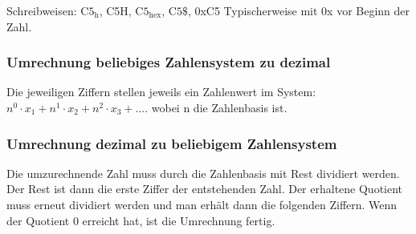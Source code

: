 Schreibweisen: $\text{C5}_{\text{h}}$, C5H, $\text{C5}_{\text{hex}}$, $\text{C5}\$$, 0xC5\newline
Typischerweise mit 0x vor Beginn der Zahl.

\subsubsection{Umrechnung beliebiges Zahlensystem zu dezimal}

Die jeweiligen Ziffern stellen jeweils ein Zahlenwert im System:\newline $n^0 \cdot x_1 + n^1 \cdot x_2 + n^2 \cdot x_3 + ....$ wobei n die Zahlenbasis ist.

\subsubsection{Umrechnung dezimal zu beliebigem Zahlensystem}

Die umzurechnende Zahl muss durch die Zahlenbasis mit Rest dividiert werden. Der Rest ist dann die erste Ziffer der entstehenden Zahl. Der erhaltene Quotient muss erneut dividiert werden und man erhält dann die folgenden Ziffern. Wenn der Quotient 0 erreicht hat, ist die Umrechnung fertig. 
